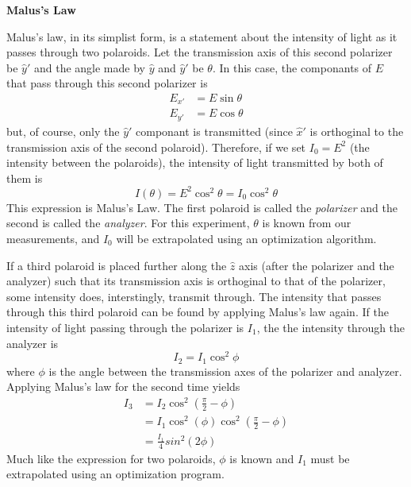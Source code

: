 \documentclass[11pt]{article}
\begin{document}
\begin{multicols}{2}
     \selectfont \textbf{Malus's Law}
    
     \selectfont 

    Malus's law, in its simplist form, is a statement about the intensity of light as it passes through two polaroids. Let the transmission axis of this second polarizer be $\hat{y}'$ and the angle made by $\hat{y}$ and $\hat{y}'$ be $\theta$. In this case, the componants of $E$ that pass through this second polarizer is
    \[
        \begin{split}
            E_{x'} &= E \sin \theta \\
            E_{y'} &= E \cos \theta
        \end{split}
    \]
    but, of course, only the $\hat{y}'$ componant is transmitted (since $\hat{x}'$ is orthoginal to the transmission axis of the second polaroid). Therefore, if we set $I_0 = E^2$ (the intensity between the polaroids), the intensity of light transmitted by both of them is
    \begin{equation}
        \label{MalusLaw}
        I(\theta) = E^2 \cos^2\theta = I_0 \cos^2\theta
    \end{equation}
    This expression is Malus's Law. The first polaroid is called the \textit{polarizer} and the second is called the \textit{analyzer}. For this experiment, $\theta$ is known from our measurements, and $I_0$ will be extrapolated using an optimization algorithm.

    If a third polaroid is placed further along the $\hat{z}$ axis (after the polarizer and the analyzer) such that its transmission axis is orthoginal to that of the polarizer, some intensity does, interstingly, transmit through. The intensity that passes through this third polaroid can be found by applying Malus's law again. If the intensity of light passing through the polarizer is $I_1$, the the intensity through the analyzer is
    \[
        I_2 = I_1 \cos^2 \phi
    \]
    where $\phi$ is the angle between the transmission axes of the polarizer and analyzer. Applying Malus's law for the second time yields
    \begin{equation}
        \begin{split}
            I_3 &= I_2 \cos^2 (\frac{\pi}{2} - \phi) \\
            &= I_1 \cos^2 (\phi) \cos^2 (\frac{\pi}{2} - \phi) \\
            & = \frac{I_1}{4} sin^2 (2 \phi) \label{MalusLaw3}
        \end{split}
    \end{equation}
    Much like the expression for two polaroids, $\phi$ is known and $I_1$ must be extrapolated using an optimization program. 
    


\end{multicols}
\end{document}
